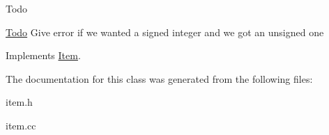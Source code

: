 \begin{DoxyRefDesc}{Todo}
\item[\mbox{\hyperlink{todo__todo000027}{Todo}}]Give error if we wanted a signed integer and we got an unsigned one \end{DoxyRefDesc}


Implements \mbox{\hyperlink{classItem}{Item}}.



The documentation for this class was generated from the following files\+:\begin{DoxyCompactItemize}
\item 
item.\+h\item 
item.\+cc\end{DoxyCompactItemize}

